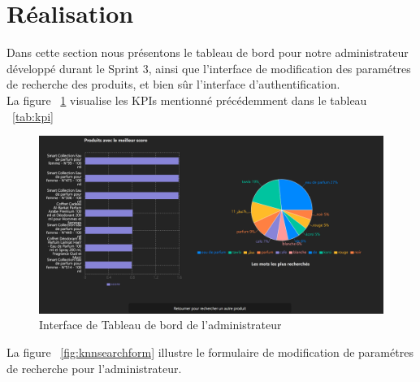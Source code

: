 \section{Réalisation}
\noindent
Dans cette section nous présentons le tableau de bord pour notre administrateur développé durant le Sprint 3, ainsi que l'interface de modification des paramétres de recherche des produits, et bien sûr l'interface d'authentification. \\
\newpage
\noindent
La figure ~\ref{fig:admindashboard} visualise les KPIs mentionné précédemment dans le tableau ~\ref{tab:kpi}

\begin{figure}[H]
    \centering
    \includegraphics[width=1\textwidth]{logos/dashboard.png}
    \caption{Interface de Tableau de bord de l'administrateur}
    \label{fig:admindashboard}
\end{figure}

\newpage
\noindent
La figure ~\ref{fig:knnsearchform} illustre le formulaire de modification de paramétres de recherche pour l'administrateur.

